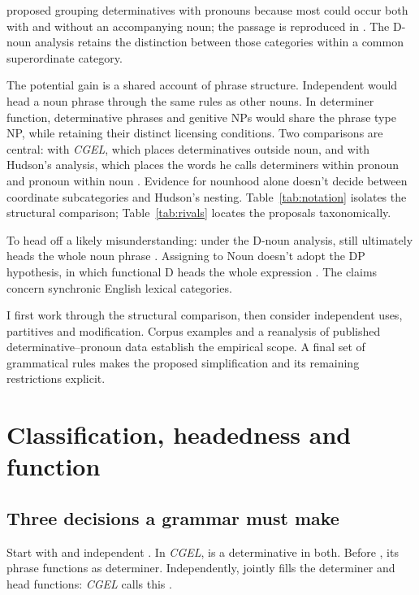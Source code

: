 \documentclass[12pt]{article}
\begin{document}
\textcite[24]{palmer1924} proposed grouping determinatives with pronouns because most could occur both with and without an accompanying noun; the passage is reproduced in \textcite[3]{reynolds2013determiners}. The D-noun analysis retains the distinction between those categories within a common superordinate category.

The potential gain is a shared account of phrase structure. Independent  would head a noun phrase through the same rules as other nouns. In determiner function, determinative phrases and genitive NPs would share the phrase type NP, while retaining their distinct licensing conditions. Two comparisons are central: with \textit{CGEL}, which places determinatives outside noun, and with Hudson's analysis, which places the words he calls determiners within pronoun and pronoun within noun \citep{hudson2004determiners,hudson2010wordgrammar}. Evidence for nounhood alone doesn't decide between coordinate subcategories and Hudson's nesting. Table~\ref{tab:notation} isolates the structural comparison; Table~\ref{tab:rivals} locates the proposals taxonomically.

To head off a likely misunderstanding: under the D-noun analysis,  still ultimately heads the whole noun phrase . Assigning  to Noun doesn't adopt the DP hypothesis, in which functional D heads the whole expression \citep{abney1987}. The claims concern synchronic English lexical categories.

I first work through the structural comparison, then consider independent uses, partitives and modification. Corpus examples and a reanalysis of published determinative--pronoun data establish the empirical scope. A final set of grammatical rules makes the proposed simplification and its remaining restrictions explicit.

\section{Classification, headedness and function}\label{sec:alternatives}

\subsection{Three decisions a grammar must make}

Start with  and independent . In \textit{CGEL},  is a determinative in both. Before , its phrase functions as determiner. Independently,  jointly fills the determiner and head functions: \textit{CGEL} calls this  \citep[410--412]{huddleston2002}.
\end{document}
